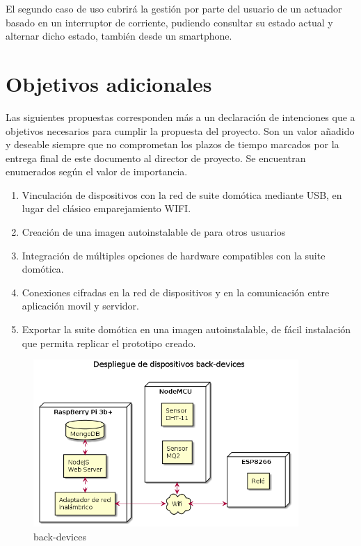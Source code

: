 El segundo caso de uso cubrirá la gestión por parte del usuario de un actuador basado en un interruptor de corriente, pudiendo consultar su estado actual y alternar dicho estado, también desde un smartphone.

\section{Objetivos adicionales}
\label{ch:Capitulo3.6}

Las siguientes propuestas corresponden más a un declaración de intenciones que a objetivos necesarios para cumplir la propuesta del proyecto. Son un valor añadido y deseable siempre que no comprometan los plazos de tiempo marcados por la entrega final de este documento al director de proyecto. Se encuentran enumerados según el valor de importancia.

\begin{enumerate}

  \item Vinculación de dispositivos con la red de suite domótica mediante USB, en lugar del clásico emparejamiento WIFI.

  \item Creación de una imagen autoinstalable de para otros usuarios

  \item Integración de múltiples opciones de hardware compatibles con la suite domótica.

  \item Conexiones cifradas en la red de dispositivos y en la comunicación entre aplicación movil y servidor.

  \item Exportar la suite domótica en una imagen autoinstalable, de fácil instalación que permita replicar el prototipo creado.

\end{enumerate}

\begin{figure}[hbt!]
\centering
\includegraphics[height=2.5in]{figures/diagrams/physical-devices/back-devices.png}
\caption[back-devices]{back-devices\footnotemark}
\end{figure}

